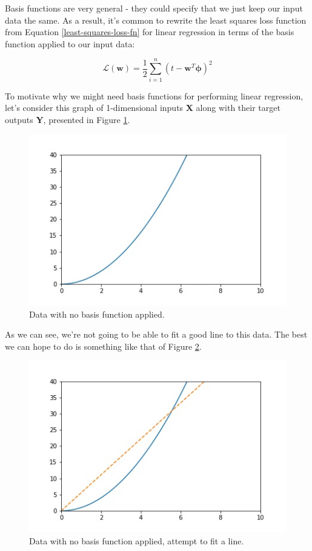 Basis functions are very general - they could specify that we just keep our input data the same. As a result, it's common to rewrite the least squares loss function from Equation \ref{least-squares-loss-fn} for linear regression in terms of the basis function applied to our input data:

\begin{equation} \label{least-squares-loss-fn-w-basis}
    \mathcal{L}(\textbf{w}) = \frac{1}{2} \sum_{i=1}^{n} (t - \textbf{w}^{T}\boldsymbol{\phi})^2
\end{equation}

To motivate why we might need basis functions for performing linear regression, let's consider this graph of 1-dimensional inputs \textbf{X} along with their target outputs \textbf{Y}, presented in Figure \ref{fig:lin-reg-no-basis-fn}.

\begin{figure}
    \centering
    \includegraphics[width=0.5\paperwidth]{../LinearRegression/fig/lin_reg_no_basis_fn_GEN.jpg}
    \caption{Data with no basis function applied.}
    \label{fig:lin-reg-no-basis-fn}
\end{figure}

As we can see, we're not going to be able to fit a good line to this data. The best we can hope to do is something like that of Figure \ref{fig:lin-reg-no-basis-fn-fitted}.

\begin{figure}
    \centering
    \includegraphics[width=0.5\paperwidth]{../LinearRegression/fig/lin_reg_no_basis_fn_fitted_GEN.jpg}
    \caption{Data with no basis function applied, attempt to fit a line.}
    \label{fig:lin-reg-no-basis-fn-fitted}
\end{figure}

